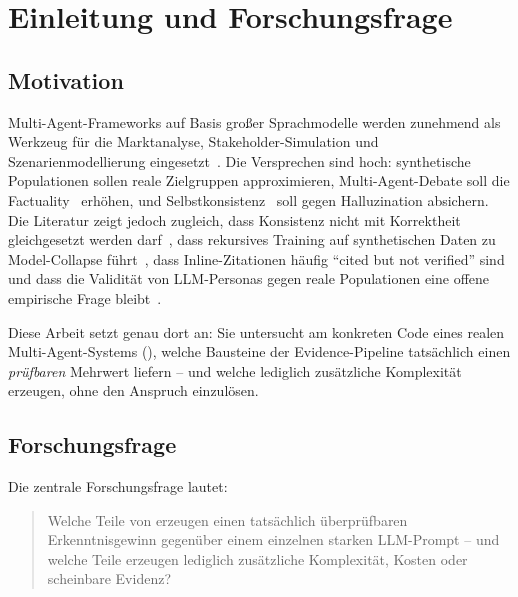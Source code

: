 
\chapter{Einleitung und Forschungsfrage}\label{ch:einleitung}

\section{Motivation}\label{sec:motivation}

Multi-Agent-Frameworks auf Basis großer Sprachmodelle werden zunehmend als Werkzeug für die Marktanalyse, Stakeholder-Simulation und Szenarienmodellierung eingesetzt~\cite{park2023generative,argyle2023silicon,horton2023homosilicus}. Die Versprechen sind hoch: synthetische Populationen sollen reale Zielgruppen approximieren, Multi-Agent-Debate soll die Factuality~\cite{du2023multiagent} erhöhen, und Selbstkonsistenz~\cite{wang2022selfconsistency} soll gegen Halluzination absichern. Die Literatur zeigt jedoch zugleich, dass Konsistenz nicht mit Korrektheit gleichgesetzt werden darf~\cite{consistency2024}, dass rekursives Training auf synthetischen Daten zu Model-Collapse führt~\cite{shumailov2024curse}, dass Inline-Zitationen häufig \enquote{cited but not verified} sind~\cite{citednotverified} und dass die Validität von LLM-Personas gegen reale Populationen eine offene empirische Frage bleibt~\cite{uas2025,analyticflexibility}.

Diese Arbeit setzt genau dort an: Sie untersucht am konkreten Code eines realen Multi-Agent-Systems (\agora{}), welche Bausteine der Evidence-Pipeline tatsächlich einen \emph{prüfbaren} Mehrwert liefern -- und welche lediglich zusätzliche Komplexität erzeugen, ohne den Anspruch einzulösen.

\section{Forschungsfrage}\label{sec:forschungsfrage}

Die zentrale Forschungsfrage lautet:

\begin{quote}
Welche Teile von \agora{} erzeugen einen tatsächlich überprüfbaren Erkenntnisgewinn gegenüber einem einzelnen starken LLM-Prompt -- und welche Teile erzeugen lediglich zusätzliche Komplexität, Kosten oder scheinbare Evidenz?
\end{quote}

